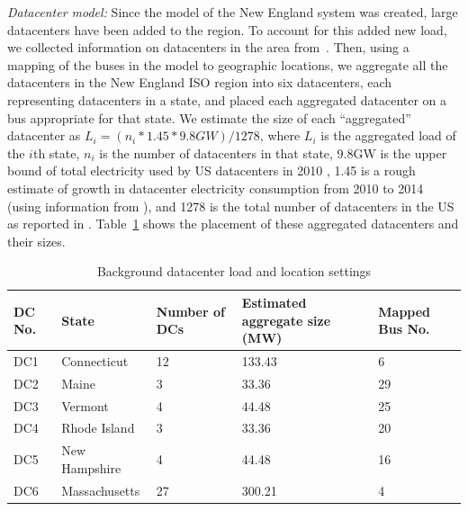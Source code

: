 {\em Datacenter model:} Since the model of the New England system was created, large datacenters have been added to the region.  To account for this added new load, we collected information on datacenters in the area from~\cite{DCmap}.  Then, using a mapping of the buses in the model to geographic locations, we aggregate all the datacenters in the New England ISO region into six datacenters, each representing datacenters in a state, and placed each aggregated datacenter on a bus appropriate for that state.  We estimate the size of each ``aggregated'' datacenter as 
$L_i=(n_i* 1.45 * 9.8GW)/1278$, where $L_i$ is the aggregated load of the $i$th state, $n_i$ is the number of datacenters in that state, 9.8GW is the upper bound of total electricity used by US datacenters in 2010 \cite{Koomey2011}, 1.45 is a rough estimate of growth in datacenter electricity consumption from 2010 to 2014 (using information from \cite{Koomey2011}), 
and 1278 is the total number of datacenters in the US as reported in \cite{DCmap}.
Table~\ref{tab:dc_setting} shows the placement of these aggregated datacenters and their sizes.

\begin{table}[ht]
\begin{center}
\caption{Background datacenter load and location settings}
\begin{tabular}{|l|l|p{30pt}|p{50pt}|p{30pt}|}
\hline
DC No. & State & Number of DCs & Estimated  aggregate size (MW) & Mapped Bus No.\\
\hline
DC1 & Connecticut & 12 &133.43 & 6\\
DC2 & Maine & 3 &33.36 & 29 \\
DC3 & Vermont & 4 &44.48 & 25 \\
DC4 & Rhode Island & 3 &33.36 & 20\\
DC5 & New Hampshire & 4& 44.48 & 16\\
DC6 & Massachusetts & 27& 300.21 & 4 \\
\hline

\end{tabular}
   \vspace{.05in}
\label{tab:dc_setting}
\end{center}
\end{table}


